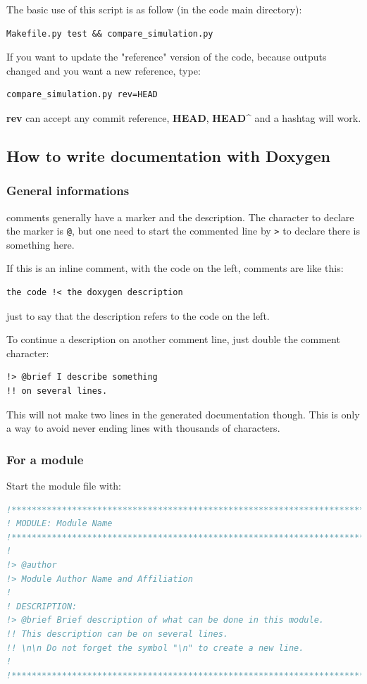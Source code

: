 \documentclass[english,a4paper,twoside]{article}
\begin{document}
The basic use of this script is as follow (in the code main directory):
\begin{verbatim}
Makefile.py test && compare_simulation.py
\end{verbatim}

\bigskip

If you want to update the "reference" version of the code, because outputs changed and you want a new reference, type:
\begin{verbatim}
compare_simulation.py rev=HEAD
\end{verbatim}
\textbf{rev} can accept any commit reference, \textbf{HEAD}, \textbf{HEAD\^} and a hashtag will work.

\subsection{How to write documentation with Doxygen}
\subsubsection{General informations}
 comments generally have a marker and the description. The character to declare the marker is \verb|@|, but one need to start the commented line by \verb|>| to declare there is something here. 

If this is an inline comment, with the code on the left, comments are like this:
\begin{verbatim}
the code !< the doxygen description
\end{verbatim}
just to say that the description refers to the code on the left.

To continue a description on another comment line, just double the comment character:
\begin{verbatim}
!> @brief I describe something
!! on several lines.
\end{verbatim}

\begin{remarque}
This will not make two lines in the generated documentation though. This is only a way to avoid never ending lines with thousands of characters.
\end{remarque}


\subsubsection{For a module}
Start the module file with:
\begin{lstlisting}[language=Fortran]
!******************************************************************************
! MODULE: Module Name
!******************************************************************************
!
!> @author
!> Module Author Name and Affiliation
!
! DESCRIPTION: 
!> @brief Brief description of what can be done in this module. 
!! This description can be on several lines. 
!! \n\n Do not forget the symbol "\n" to create a new line.
!
!******************************************************************************
\end{lstlisting}
\end{document}
